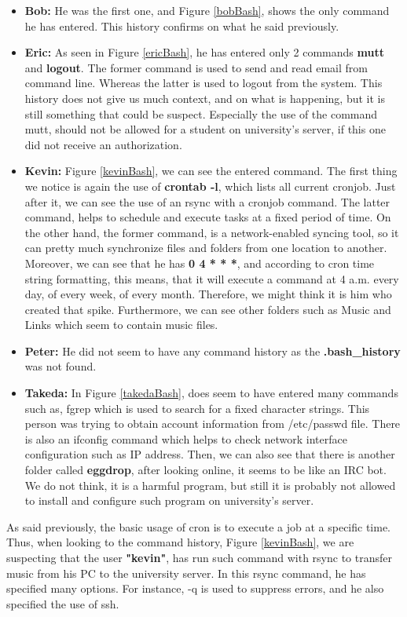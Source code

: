 \documentclass[a4paper,12pt]{article}
\begin{document}
\begin{itemize}
\item \textbf{Bob:} He was the first one, and Figure \ref{bobBash}, shows the only command he has entered. This history confirms on what he said previously.
\item \textbf{Eric:} As seen in Figure  \ref{ericBash}, he has entered only 2 commands \textbf{mutt} and \textbf{logout}. The former command is used to send and read email from command line. Whereas the latter is used to logout from the system. This history does not give us much context, and on what is happening, but it is still something that could be suspect. Especially the use of the command mutt, should not be allowed for a student on university's server, if this one did not receive an authorization. 
\item \textbf{Kevin:} Figure \ref{kevinBash}, we can see the entered command. The first thing we notice is again the use of \textbf{crontab -l}, which lists all current cronjob. Just after it, we can see the use of an rsync with a cronjob command. The latter command, helps to schedule and execute tasks at a fixed period of time. On the other hand, the former command, is a network-enabled syncing tool, so it can pretty much synchronize files and folders from one location to another. Moreover, we can see that he has \textbf{0 4 * * *}, and according to cron time string formatting, this means, that it will execute a command at 4 a.m. every day, of every week, of every month. Therefore, we might think it is him who created that spike. Furthermore, we can see other folders such as Music and Links which seem to contain music files. 
\item \textbf{Peter:} He did not seem to have any command history as the \textbf{.bash\_history} was not found.
\item \textbf{Takeda:} In Figure \ref{takedaBash}, does seem to have entered many commands such as, fgrep which is used to search for a fixed character strings. This person was trying to obtain account information from /etc/passwd file. There is also an ifconfig command which helps to check network interface configuration such as IP address. Then, we can also see that there is another folder called \textbf{eggdrop}, after looking online, it seems to be like an IRC bot. We do not think, it is a harmful program, but still it is probably not allowed to install and configure such program on university's server.  
\end{itemize}

As said previously, the basic usage of cron is to execute a job at a specific time. Thus, when looking to the command history, Figure \ref{kevinBash}, we are suspecting that the user \textbf{"kevin"}, has run such command with rsync to transfer music from his PC to the university server. In this rsync command, he has specified many options. For instance, -q is used to suppress errors, and he also specified the use of ssh.
\end{document}
